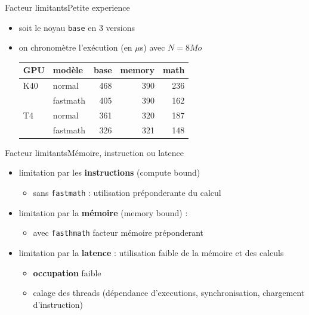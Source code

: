 \documentclass[11pt,mathserif]{beamer}
\begin{document}
\begin{frame}{Facteur limitants}{Petite experience}
  \begin{itemize}[<+->]
    \item soit le noyau \texttt{base} en 3 versions
      
    \item on chronomètre l'exécution (en $\mu$s) avec $N=8Mo$ 
    \begin{minipage}[l]{0.49\linewidth}
      \begin{center}
        \begin{tabular}{|l |l|r|r|r|}
          \hline
          GPU & modèle    & base    & memory & math  \\ 
          \hline
          K40 &normal    &  468    &  390   &  236\\ 
              &fastmath  &  405    &  390   &  162 \\ 
          \hline
          T4 & normal    &  361    &  320   &  187\\ 
             & fastmath  &  326    &  321   &  148 \\ 
          \hline
        \end{tabular}
      \end{center}
    \end{minipage}
  \end{itemize}
\end{frame}
\begin{frame}{Facteur limitants}{Mémoire, instruction ou latence}
  \begin{itemize}[<+->]
    \item limitation par les {\bf instructions} (compute bound) 
      \begin{itemize}
        \item sans {\tt fastmath} : utilisation préponderante du calcul
      \end{itemize}
    \item limitation par la {\bf mémoire } (memory bound) : 
      \begin{itemize}
        \item avec {\tt fasthmath} facteur mémoire préponderant
      \end{itemize}
    \item limitation par la {\bf latence} : utilisation faible de la mémoire et des calculs
      \begin{itemize}
        \item {\bf occupation} faible 
        \item calage des threads (dépendance d'executions, synchronisation, chargement d'instruction)
      \end{itemize}
\end{itemize}
\end{frame}
\end{document}
